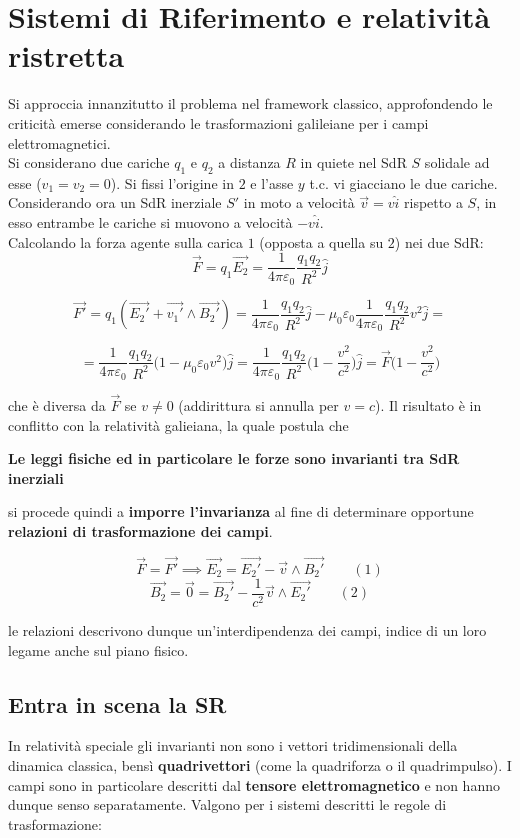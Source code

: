 \section{Sistemi di Riferimento e relatività ristretta}
Si approccia innanzitutto il problema nel framework classico, approfondendo le criticità emerse considerando le trasformazioni galileiane per i campi elettromagnetici.
\\Si considerano due cariche $q_1$ e $q_2$ a distanza $R$ in quiete nel SdR $S$ solidale ad esse ($v_1 = v_2 = 0$). Si fissi l'origine in $2$ e l'asse $y$ t.c. vi giacciano le due cariche. Considerando ora un SdR inerziale $S'$ in moto a velocità $\vec{v} = v \hat{i}$ rispetto a $S$, in esso entrambe le cariche si muovono a velocità $- v \hat{i}$.
\\Calcolando la forza agente sulla carica $1$ (opposta a quella su $2$) nei due SdR:
\[\vec{F} = q_1 \vec{E_2} = \frac{1}{4 \pi \varepsilon_0} \frac{q_1 q_2}{R^2} \hat{j}\]

\[\vec{F'} = q_1 (\vec{E_2'} + \vec{v_1'} \wedge \vec{B_2'}) = \frac{1}{4 \pi \varepsilon_0} \frac{q_1 q_2}{R^2} \hat{j} - \mu_0 \varepsilon_0 \frac{1}{4 \pi \varepsilon_0} \frac{q_1 q_2}{R^2} v^2 \hat{j} =\]

\[= \frac{1}{4 \pi \varepsilon_0} \frac{q_1 q_2}{R^2} \big(1 - \mu_0 \varepsilon_0 v^2 \big) \hat{j} = \frac{1}{4 \pi \varepsilon_0} \frac{q_1 q_2}{R^2} \big(1 - \frac{v^2}{c^2} \big) \hat{j} = \vec{F} \big(1 - \frac{v^2}{c^2} \big)\]

che è diversa da $\vec{F}$ se $v \neq 0$ (addirittura si annulla per $v = c$). Il risultato è in conflitto con la relatività galieiana, la quale postula che
\begin{center}
\textbf{Le leggi fisiche ed in particolare le forze sono invarianti tra SdR inerziali}
\end{center}

si procede quindi a \textbf{imporre l'invarianza} al fine di determinare opportune \textbf{relazioni di trasformazione dei campi}.

\[\vec{F} = \vec{F'} \implies \vec{E_2} = \vec{E_2'} - \vec{v} \wedge \vec{B_2'} \qquad (1)\]
\[\vec{B_2} = \vec{0} = \vec{B_2'} - \frac{1}{c^2} \vec{v} \wedge \vec{E_2'} \qquad (2)\]

le relazioni descrivono dunque un'interdipendenza dei campi, indice di un loro legame anche sul piano fisico.

\subsection{Entra in scena la SR}
In relatività speciale gli invarianti non sono i vettori tridimensionali della dinamica classica, bensì \textbf{quadrivettori} (come la quadriforza o il quadrimpulso). I campi sono in particolare descritti dal \textbf{tensore elettromagnetico} e non hanno dunque senso separatamente. Valgono per i sistemi descritti le regole di trasformazione:

